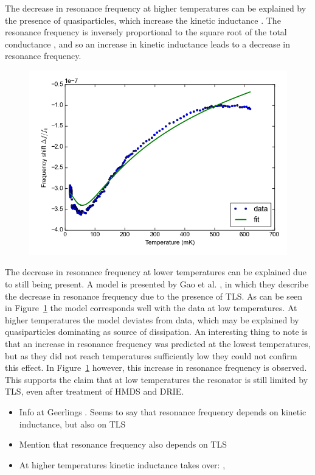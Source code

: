 \documentclass[12pt]{report}
\begin{document}
The decrease in resonance frequency at higher temperatures can be explained by the presence of quasiparticles, which increase the kinetic inductance \cite[p.~91]{Geerlings}. The resonance frequency is inversely proportional to the square root of the total conductance \cite{barends2008contribution}, and so an increase in kinetic inductance leads to a decrease in resonance frequency.

\begin{figure}[h]
    \centering
    \includegraphics[width=.7\textwidth]{Figures/Temperature increase tracking - f0 vs T with fit.png}
    \label{fig:f0_vs_T_with_fit}
\end{figure}

The decrease in resonance frequency at lower temperatures can be explained due to still being present. A model is presented by Gao et al. \cite{gao2008experimental}, in which they describe the decrease in resonance frequency due to the presence of TLS. As can be seen in Figure~\ref{fig:f0_vs_T_with_fit} the model corresponds well with the data at low temperatures. At higher temperatures the model deviates from data, which may be explained by quasiparticles dominating as source of dissipation. An interesting thing to note is that an increase in resonance frequency was predicted at the lowest temperatures, but as they did not reach temperatures sufficiently low they could not confirm this effect. In Figure~\ref{fig:f0_vs_T_with_fit} however, this increase in resonance frequency is observed. This supports the claim that at low temperatures the resonator is still limited by TLS, even after treatment of HMDS and DRIE.

\begin{itemize}
    \item Info at Geerlings \cite[p.~106]{Geerlings}. Seems to say that resonance frequency depends on kinetic inductance, but also on TLS
    \item Mention that resonance frequency also depends on TLS
    \item At higher temperatures kinetic inductance takes over: \cite{barends2008contribution}, \cite[ch.~3]{Gao}
\end{itemize}
\end{document}
